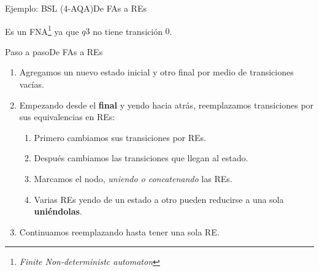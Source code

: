 \documentclass[spanish]{beamer}
\begin{document}
\begin{frame}{Ejemplo: BSL (4-AQA)}{De FAs a REs}
    \begin{center}
    \end{center} \pause

    Es un FNA\footnote{\textit{Finite Non-deterministc automaton}} ya que $q3$ no tiene transición $0$.
\end{frame}

\begin{frame}{Paso a paso}{De FAs a REs}
    \begin{enumerate}
        \itemsep1.5em
        \item Agregamos un nuevo estado inicial y otro final por medio de transiciones vacías. \pause
        \item Empezando desde el \textbf{final} y yendo hacia atrás, reemplazamos transiciones por sus equivalencias en REs: \pause
        \begin{enumerate}
            \itemsep1.1em
            \item Primero cambiamos sus transiciones por REs. \pause
            \item Después cambiamos las transiciones que llegan al estado. \pause
            \item Marcamos el nodo, \textit{uniendo o concatenando} las REs. \pause
            \item Varias REs yendo de un estado a otro pueden reducirse a una sola \textbf{uniéndolas}. \pause
        \end{enumerate}
        \item Continuamos reemplazando hasta tener una sola RE.
    \end{enumerate}
\end{frame}
\end{document}
